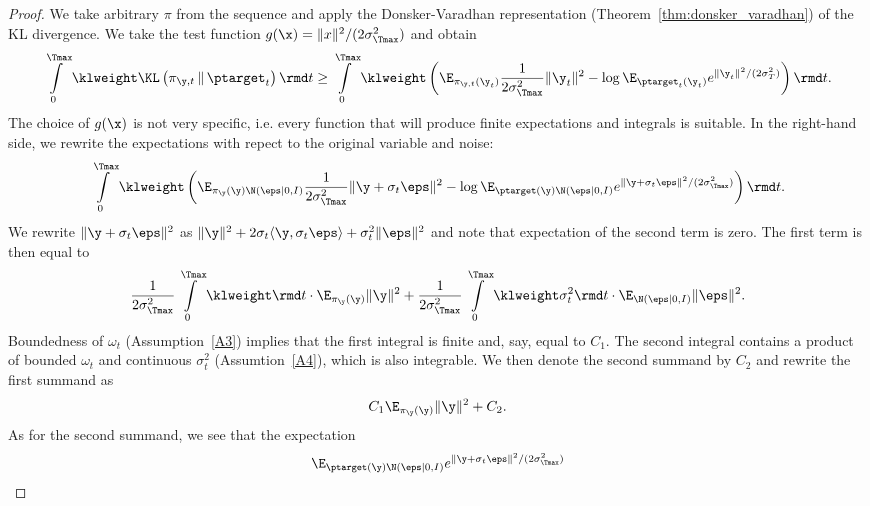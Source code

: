 \begin{proof}
    We take arbitrary $\pi$ from the sequence and apply the Donsker-Varadhan representation (Theorem~\ref{thm:donsker_varadhan}) of the KL divergence. We take the test function $g(\x) = \|x\|^2 / (2\sigma_{\Tmax}^2)$ and obtain
    \begin{equation}
        \int\limits_{0}^{\Tmax} \klweight \KL\left(\pi_{\y, t} \,\|\, \ptarget_t\right) \rmd t \geq \int\limits_{0}^{\Tmax} \klweight \left(\E_{\pi_{\y, t}(\y_t)} \frac{1}{2\sigma_{\Tmax}^2} \|\y_t\|^2 - \log \E_{\ptarget_t(\y_t)}e^{ \|\y_t\|^2 / (2\sigma_{T}^2)} \right) \rmd t.
    \end{equation}
    The choice of $g(\x)$ is not very specific, i.e. every function that will produce finite expectations and integrals is suitable. In the right-hand side, we rewrite the expectations with repect to the original variable and noise:
    \begin{equation}
    \int\limits_{0}^{\Tmax} \klweight \left(\E_{\pi_{\y}(\y)\N(\eps | 0, I)}\frac{1}{2\sigma_{\Tmax}^2} \|\y + \sigma_t \eps \|^2 - \log \E_{\ptarget(\y)\N(\eps | 0, I)}e^{\|\y + \sigma_t \eps \|^2 / (2 \sigma_{\Tmax}^2)}\right) \rmd t.
    \end{equation}
    We rewrite $\|\y + \sigma_t \eps \|^2$ as $\|\y\|^2 + 2 \sigma_t \langle \y, \sigma_t \eps \rangle + \sigma_t^2 \|\eps\|^2$ and note that expectation of the second term is zero. The first term is then equal to
    \begin{equation}
        \frac{1}{2\sigma_{\Tmax}^2} \int\limits_{0}^{\Tmax} \klweight \rmd t \cdot \E_{\pi_{\y}(\y)}\|\y\|^2 + \frac{1}{2\sigma_{\Tmax}^2} \int\limits_{0}^{\Tmax} \klweight \sigma_{t}^2 \rmd t \cdot \E_{\N(\eps | 0, I)} \|\eps \|^2.
    \end{equation}
    Boundedness of $\omega_t$ (Assumption~\ref{A3}) implies that the first integral is finite and, say, equal to $C_1$. The second integral contains a product of bounded $\omega_t$ and continuous $\sigma_t^2$ (Assumtion~\ref{A4}), which is also integrable. We then denote the second summand by $C_2$ and rewrite the first summand as
    \begin{equation}
        C_1 \E_{\pi_{\y}(\y)} \| \y \|^2 + C_2.
    \end{equation}
    As for the second summand, we see that the expectation    \begin{equation}
        \E_{\ptarget(\y)\N(\eps | 0, I)}e^{\|\y + \sigma_t \eps\|^2 / (2 \sigma_{\Tmax}^2)}
    \end{equation}

\end{proof}
